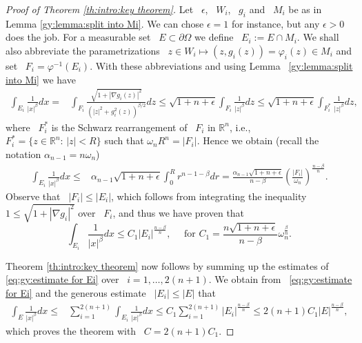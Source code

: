 \documentclass[reqno,12pt]{amsart}
\newcommand{\R}{\mathbb{R}}
\numberwithin{equation}{section}
\theoremstyle{plain}
\theoremstyle{definition}
\renewcommand{\leq}{\leqslant}
\begin{document}
\begin{proof}[Proof of Theorem \ref{th:intro:key theorem}]
Let ~$\epsilon$, ~$W_i$, ~$g_i$ and ~$M_i$ be as in Lemma \ref{gy:lemma:split into Mi}. We can chose $\epsilon=1$ for instance, but any $\epsilon>0$ does the job. For a measurable set ~$E\subset \partial\Omega$ we define ~$E_i:=E\cap M_i$. We shall also abbreviate the parametrizations ~$z\in W_i\mapsto(z,g_i(z))=\varphi_i(z)\in M_i$ and set ~$F_i=\varphi^{-1}(E_i)$. With these abbreviations and using Lemma ~\ref{gy:lemma:split into Mi} we have 
\begin{align*}
    \int_{E_i}\frac{1}{|x|^{\beta}}dx
    =&
    \int_{F_i}\frac{\sqrt{1+|\nabla g_i(z)|^2}}{(|z|^2+g_i^2(z))^{\beta/2}}dz
    \leq
    \sqrt{1+n+\epsilon}\int_{F_i}\frac{1}{|z|^{\beta}}dz
    \leq
    \sqrt{1+n+\epsilon}\int_{F_i^*}\frac{1}{|z|^{\beta}}dz,
\end{align*}
where ~$F_i^*$ is the Schwarz rearrangement of ~$F_i$ in $\R^n$, i.e., ~$F_i^*=\{z\in\R^n:\,|z|<R\}$ such that $\omega_n R^n=|F_i|$. Hence we obtain (recall the notation $\alpha_{n-1}=n\omega_n$)
\begin{align*}
        \int_{E_i}\frac{1}{|x|^{\beta}}dx
    \leq & \alpha_{n-1}\sqrt{1+n+\epsilon}\int_0^{R}r^{n-1-\beta}dr
    =\frac{\alpha_{n-1}\sqrt{1+n+\epsilon}}{n-\beta}\left(\frac{|F_i|}{\omega_n}\right)^{\frac{n-\beta}{n}}.
\end{align*}
Observe that ~$|F_i|\leq |E_i|$, which follows from integrating the inequality ~$1\leq \sqrt{1+|\nabla g_i|^2}$ over ~$F_i$, and thus we have proven that 
\begin{equation}
 \label{eq:gy:estimate for Ei}
   \int_{E_i}\frac{1}{|x|^{\beta}}dx\leq C_1 |E_i|^{\frac{n-\beta}{n}},\quad
   \text{ for }C_1=\frac{n\sqrt{1+n+\epsilon}}{n-\beta} \omega_n^{\frac{\beta}{n}}.
\end{equation}

Theorem \ref{th:intro:key theorem}  now follows by summing up the estimates of \eqref{eq:gy:estimate for Ei} over ~$i=1,\ldots, 2(n+1)$. We obtain from ~\eqref{eq:gy:estimate for Ei} and the generous estimate ~$|E_i|\leq |E|$ that 
\begin{align*}
    \int_{E}\frac{1}{|x|^{\beta}}dx\leq & \sum_{i=1}^{2(n+1)}\int_{E_i}\frac{1}{|x|^{\beta}}dx\leq C_1\sum_{i=1}^{2(n+1)}|E_i|^{\frac{n-\beta}{n}}
    \leq 
    2(n+1)C_1 |E|^{\frac{n-\beta}{n}},
\end{align*}
which proves the theorem with 
~$
  C=2(n+1)C_1
$.
\end{proof}
\end{document}
